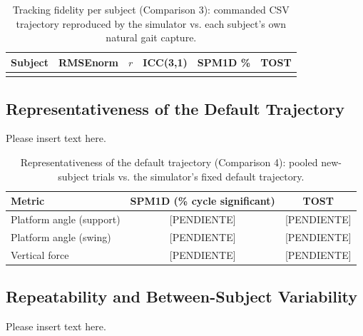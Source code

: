 \documentclass[journal,twocolumn,letterpaper]{IEEEJERM}
\begin{document}
\begin{table}[!t]
\caption{Tracking fidelity per subject (Comparison 3): commanded CSV
trajectory reproduced by the simulator vs. each subject's own natural
gait capture.}
\label{tab:comparacion3}
\centering
\begin{tabular}{lccccc}
\hline
Subject & RMSEnorm & $r$ & ICC(3,1) & SPM1D \% & TOST \\
\hline
[PENDIENTE] & & & & & \\
\hline
\end{tabular}
\end{table}


\subsection*{Representativeness of the Default Trajectory}
Please insert text here.

\begin{table}[!t]
\caption{Representativeness of the default trajectory (Comparison 4):
pooled new-subject trials vs. the simulator's fixed default trajectory.}
\label{tab:comparacion4}
\centering
\begin{tabular}{lcc}
\hline
Metric & SPM1D (\% cycle significant) & TOST \\
\hline
Platform angle (support) & [PENDIENTE] & [PENDIENTE] \\
Platform angle (swing) & [PENDIENTE] & [PENDIENTE] \\
Vertical force & [PENDIENTE] & [PENDIENTE] \\
\hline
\end{tabular}
\end{table}

\subsection*{Repeatability and Between-Subject Variability}
Please insert text here.
\end{document}
